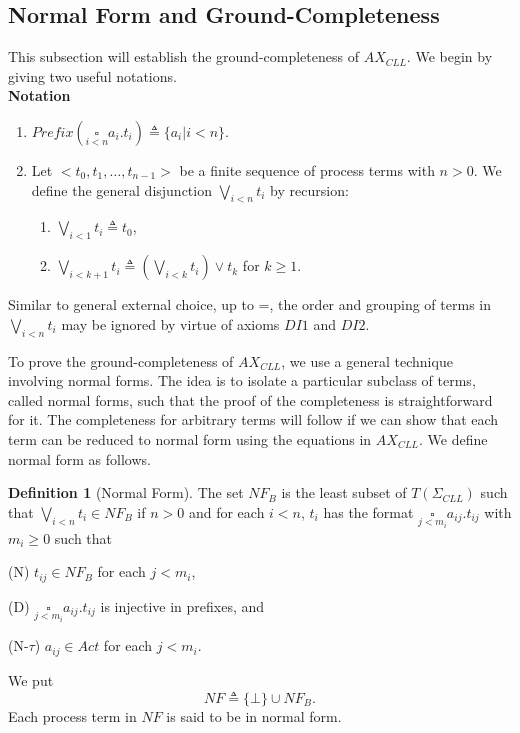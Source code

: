 \documentclass{elsarticle}
\theoremstyle{plain}
\theoremstyle{definition}
\newtheorem{mydefn}[theorem]{Definition}
\begin{document}
\subsection{Normal Form and Ground-Completeness}
This subsection will establish the ground-completeness of $AX_{CLL}$. We begin by giving two useful notations.\\

\noindent \textbf{Notation}
\begin{enumerate}
  \item $Prefix(\underset{i<n}{\square}a_i.t_i)\triangleq \{a_i|i<n\}$.
  \item Let $<t_0,t_1,\dots,t_{n-1}>$ be a finite sequence of process terms with $n > 0$. We define the general disjunction $\underset{i<n}\bigvee t_i$ by recursion:
    \begin{enumerate}
    \item $\underset{i<1}\bigvee t_i \triangleq t_0$,
    \item $\underset{i<k+1}\bigvee t_i \triangleq (\underset{i<k}\bigvee t_i) \vee t_k$ for $k\geq 1$.
    \end{enumerate}
\end{enumerate}

Similar to general external choice, up to =, the order and grouping of terms in $\underset{i<n}\bigvee t_i$  may be ignored by virtue of axioms $DI1$ and $DI2$.

To prove the ground-completeness of $AX_{CLL}$, we use a general technique involving normal forms.
The idea is to isolate a particular subclass of terms, called normal forms, such that the proof of the completeness is straightforward for it.
The completeness for arbitrary terms will follow if we can show that each term can be reduced to normal form using the equations in $AX_{CLL}$.
We define normal form as follows.

\begin{mydefn}[Normal Form]\label{D:NORMAL_FORM}
    The set $NF_B$ is the least subset of $T(\Sigma_{CLL})$ such that $\underset{i< n}{\bigvee}t_i\in NF_B$ if $n > 0$ and for each $i<n$, $t_i$ has the format $\underset{j< m_i}{\square}a_{ij}.t_{ij}$ with $m_i \geq 0$ such that

        \noindent (N)\;\;\;  $t_{ij}\in NF_B$ for each $j<m_i$,

        \noindent (D) \;\; $\underset{j< m_i}{\square}a_{ij}.t_{ij}$ is injective in prefixes, and

        \noindent (N-$\tau$)  $a_{ij} \in Act$ for each $j<m_i$.

We put \[NF \triangleq\{ \bot \} \cup NF_B.\]
Each process term in $NF$ is said to be  in normal form.
\end{mydefn}
\end{document}
